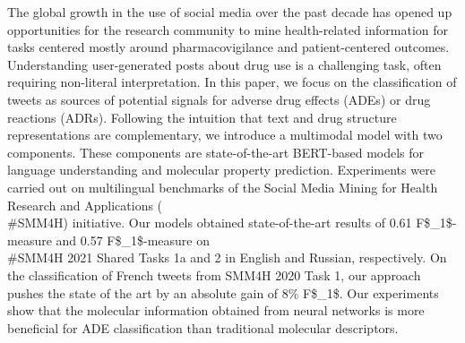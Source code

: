 The global growth in the use of social media over the past decade has opened up opportunities for the research community to mine health-related information for tasks centered mostly around pharmacovigilance and patient-centered outcomes. Understanding user-generated posts about drug use is a challenging task, often requiring non-literal interpretation. In this paper, we focus on the classification of tweets as sources of potential signals for adverse drug effects (ADEs) or drug reactions (ADRs). Following the intuition that text and drug structure representations are complementary, we introduce a multimodal model with two components. These components are state-of-the-art BERT-based models for language understanding and molecular property prediction. Experiments were carried out on multilingual benchmarks of the Social Media Mining for Health Research and Applications (\\#SMM4H) initiative. Our models obtained state-of-the-art results of 0.61 F\$\_1\$-measure and 0.57 F\$\_1\$-measure on \\#SMM4H 2021 Shared Tasks 1a and 2 in English and Russian, respectively. On the classification of French tweets from SMM4H 2020 Task 1, our approach pushes the state of the art by an absolute gain of 8\% F\$\_1\$. Our experiments show that the molecular information obtained from neural networks is more beneficial for ADE classification than traditional molecular descriptors.
